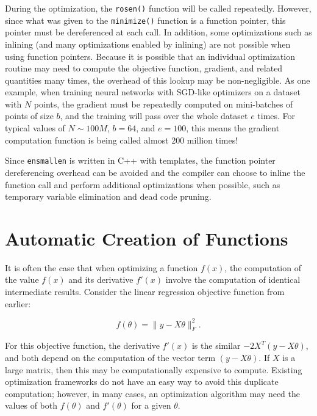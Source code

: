 \documentclass{article}
\begin{document}


During the optimization, the {\tt rosen()} function will be called repeatedly.
However, since what was given to the {\tt minimize()} function is a function
pointer, this pointer must be dereferenced at each call.  In addition, some
optimizations such as inlining (and many optimizations enabled by inlining) are
not possible when using function pointers.  Because it is possible that an
individual optimization routine may need to compute the objective function,
gradient, and related quantities many times, the overhead of this lookup may be
non-negligible.  As one example, when training neural networks with SGD-like
optimizers on a dataset with $N$ points, the gradient must be repeatedly
computed on mini-batches of points of size $b$, and the training will pass over
the whole dataset $e$ times.  For typical values of $N \sim 100M$, $b = 64$, and
$e = 100$, this means the gradient computation function is being called almost
200 million times!

Since {\tt ensmallen} is written in C++ with templates, the function pointer
dereferencing overhead can be avoided and the compiler can choose to inline the
function call and perform additional optimizations when possible, such as
temporary variable elimination and dead code pruning.

\section{Automatic Creation of Functions}

It is often the case that when optimizing a function $f(x)$, the computation of
the value $f(x)$ and its derivative $f'(x)$ involve the computation of identical
intermediate results.  Consider the linear regression objective function from
earlier:

\begin{equation}
f(\theta) = \| y - X\theta \|_F^2.
\end{equation}

For this objective function, the derivative $f'(x)$ is the similar $-2 X^T (y -
X \theta)$, and both depend on the computation of the vector term $(y - X
\theta)$.  If $X$ is a large matrix, then this may be computationally expensive
to compute.  Existing optimization frameworks do not have an easy way to avoid
this duplicate computation; however, in many cases, an optimization algorithm
may need the values of both $f(\theta)$ and $f'(\theta)$ for a given $\theta$.
\end{document}
